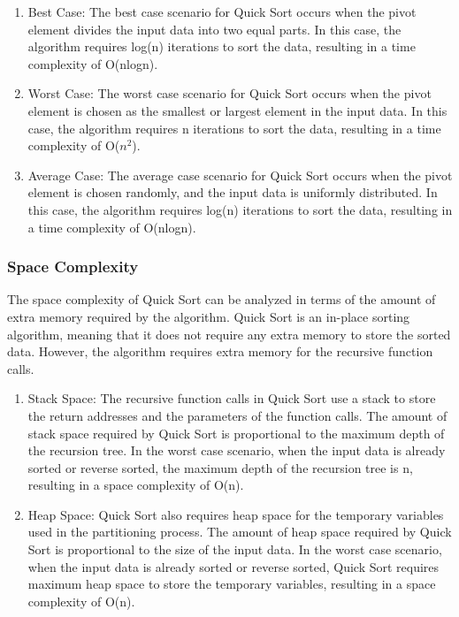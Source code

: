 \documentclass[a4paper, 11pt, oneside]{book} %
\begin{document}
\begin{enumerate}
  \item Best Case: The best case scenario for Quick Sort occurs when the pivot element divides the input data into two equal parts. In this case, the algorithm requires log(n) iterations to sort the data, resulting in a time complexity of O(nlogn).
  \item Worst Case: The worst case scenario for Quick Sort occurs when the pivot element is chosen as the smallest or largest element in the input data. In this case, the algorithm requires n iterations to sort the data, resulting in a time complexity of O($n^2$).
  \item Average Case: The average case scenario for Quick Sort occurs when the pivot element is chosen randomly, and the input data is uniformly distributed. In this case, the algorithm requires log(n) iterations to sort the data, resulting in a time complexity of O(nlogn).    
  
\end{enumerate}


  \subsubsection{Space Complexity}
    The space complexity of Quick Sort can be analyzed in terms of the amount of extra memory required by the algorithm. Quick Sort is an in-place sorting algorithm, meaning that it does not require any extra memory to store the sorted data. However, the algorithm requires extra memory for the recursive function calls.
    \begin{enumerate}
  \item Stack Space: The recursive function calls in Quick Sort use a stack to store the return addresses and the parameters of the function calls. The amount of stack space required by Quick Sort is proportional to the maximum depth of the recursion tree. In the worst case scenario, when the input data is already sorted or reverse sorted, the maximum depth of the recursion tree is n, resulting in a space complexity of O(n).
  \item Heap Space: Quick Sort also requires heap space for the temporary variables used in the partitioning process. The amount of heap space required by Quick Sort is proportional to the size of the input data. In the worst case scenario, when the input data is already sorted or reverse sorted, Quick Sort requires maximum heap space to store the temporary variables, resulting in a space complexity of O(n).
  
\end{enumerate}
\end{document}
